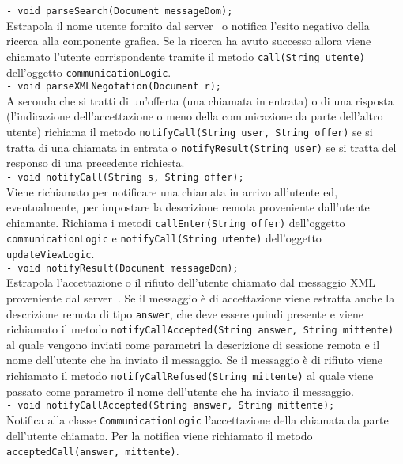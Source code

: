 {{\begin{sloppypar}
{{\begin{itemize}
{					\texttt{- void parseSearch(Document messageDom);}\\
					Estrapola il nome utente fornito dal server\g~ o notifica l'esito negativo della ricerca alla componente grafica. Se la ricerca ha avuto successo allora viene chiamato l'utente corrispondente tramite il metodo \texttt{call(String utente)} dell'oggetto \texttt{communicationLogic}.\\

					\texttt{- void parseXMLNegotation(Document r);}\\
					A seconda che si tratti di un'offerta (una chiamata in entrata) o di una risposta (l'indicazione dell'accettazione o meno della comunicazione da parte dell'altro utente) richiama il metodo \texttt{notifyCall(String user, String offer)} se si tratta di una chiamata in entrata o \texttt{notifyResult(String user)} se si tratta del responso di una precedente richiesta.\\

					\texttt{- void notifyCall(String s, String offer);}\\
					Viene richiamato per notificare una chiamata in arrivo all'utente ed, eventualmente, per impostare la descrizione remota proveniente dall'utente chiamante. Richiama i metodi \texttt{callEnter(String offer)} dell'oggetto \texttt{communicationLogic} e \texttt{notifyCall(String utente)} dell'oggetto \texttt{updateViewLogic}.\\

					\texttt{- void notifyResult(Document messageDom);}\\
					Estrapola l'accettazione o il rifiuto dell'utente chiamato dal messaggio XML\g~ proveniente dal server\g~. Se il messaggio è di accettazione viene estratta anche la descrizione remota di tipo \texttt{answer}, che deve essere quindi presente e viene richiamato il metodo \texttt{notifyCallAccepted(String answer, String mittente)} al quale vengono inviati come parametri la descrizione di sessione remota e il nome dell'utente che ha inviato il messaggio. Se il messaggio è di rifiuto viene richiamato il metodo \texttt{notifyCallRefused(String mittente)} al quale viene passato come parametro il nome dell'utente che ha inviato il messaggio.\\

					\texttt{- void notifyCallAccepted(String answer, String mittente);}\\
					Notifica alla classe \texttt{CommunicationLogic} l'accettazione della chiamata da parte dell'utente chiamato. Per la notifica viene richiamato il metodo \texttt{acceptedCall(answer, mittente)}.\\

}
\end{itemize}}}
\end{sloppypar}}}

